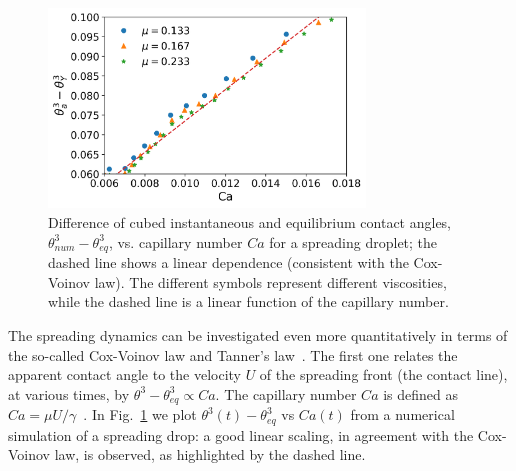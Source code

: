 \begin{figure}
    \centering 
    \includegraphics[width=0.75\textwidth]{graphics/Fig_5_Indirect_Cox_Voinov_all_data_visually_appealing_slip_2_m_nosci.png}
    \caption{Difference of cubed instantaneous and equilibrium contact angles, $\theta_{num}^3-\theta_{eq}^3$, vs. capillary number $Ca$ for a spreading droplet; the dashed line shows a linear dependence (consistent with the Cox-Voinov law). The different symbols represent different viscosities, while the dashed line is a linear function of the capillary number.
    \label{fig:Cox-Voinov}}
\end{figure}
The spreading dynamics can be investigated even more quantitatively in terms of the 
so-called Cox-Voinov law and Tanner's law~\cite{Tanner_1979}. The first one relates the apparent contact angle to 
the velocity $U$ of the spreading front (the contact line), at various times, by 
$\theta^3 - \theta_{eq}^3 \propto Ca$. The capillary number $Ca$ is defined
as $Ca=\mu U/\gamma$~\cite{doi:10.1146/annurev-fluid-011212-140734}.
In Fig.~\ref{fig:Cox-Voinov} we plot $\theta^3(t) - \theta_{eq}^3$ vs $Ca(t)$ from a numerical simulation of a spreading drop: a good linear scaling, in agreement with the Cox-Voinov law, is 
observed, as highlighted by the dashed line. 


